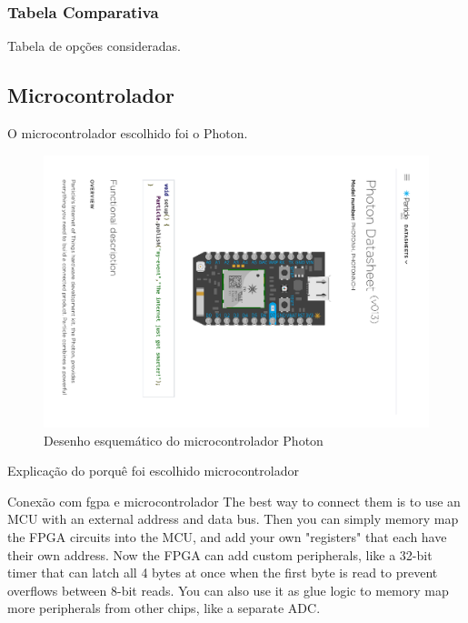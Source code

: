 \begin{table}[h!]
	\subsubsection{Tabela Comparativa}\label{fpga-table}
	
	Tabela de opções consideradas.
	
	\subsection{Microcontrolador}\label{hard-uc}
	
	O microcontrolador escolhido foi o Photon.
	
	\begin{figure}[htb]
		\caption{\label{fig_photon} Desenho esquemático do microcontrolador Photon}
		\begin{center}
			\includegraphics[width=0.5\textheight, trim={11.7cm 7.9cm 7.8cm 7.4cm}, clip]{photon.pdf}
		\end{center}
	\end{figure}

	
	Explicação do porquê foi escolhido microcontrolador
	
	Conexão com fgpa e microcontrolador
	The best way to connect them is to use an MCU with an external address and data bus. Then you can simply memory map the FPGA circuits into the MCU, and add your own "registers" that each have their own address. Now the FPGA can add custom peripherals, like a 32-bit timer that can latch all 4 bytes at once when the first byte is read to prevent overflows between 8-bit reads. You can also use it as glue logic to memory map more peripherals from other chips, like a separate ADC.
	

\end{table}
